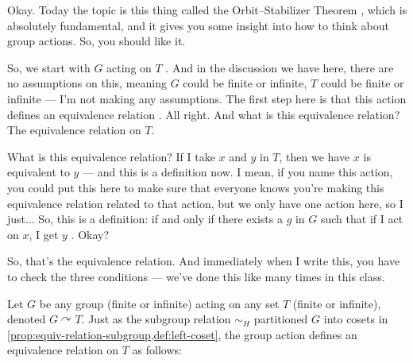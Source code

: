 \begin{speech}[00:09:16 - 00:11:11]
Okay. Today the topic is this thing called the Orbit--Stabilizer Theorem , which is absolutely fundamental, and it gives you some insight into how to think about group actions. So, you should like it.

So, we start with $G$ acting on $T$ . And in the discussion we have here, there are no assumptions on this, meaning $G$ could be finite or infinite, $T$ could be finite or infinite --- I'm not making any assumptions. The first step here is that this action defines an equivalence relation . All right. And what is this equivalence relation? The equivalence relation on $T$.

What is this equivalence relation? If I take $x$ and $y$ in $T$, then we have $x$ is equivalent to $y$ --- and this is a definition now. I mean, if you name this action, you could put this here  to make sure that everyone knows you're making this equivalence relation related to that action, but we only have one action here, so I just... So, this is a definition: if and only if there exists a $g$ in $G$ such that if I act on $x$, I get $y$ . Okay?

So, that's the equivalence relation. And immediately when I write this, you have to check the three conditions --- we've done this like many times in this class. 
\end{speech}

\begin{content}
Let $G$ be any group (finite or infinite) acting on any set $T$ (finite or infinite), denoted $G \curvearrowright T$. Just as the subgroup relation $\sim_H$ partitioned $G$ into cosets in \cref{prop:equiv-relation-subgroup,def:left-coset}, the group action defines an equivalence relation on $T$ as follows:

\end{content}

